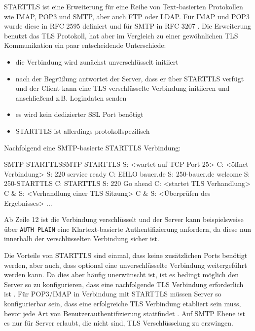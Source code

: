 STARTTLS ist eine Erweiterung für eine Reihe von Text-basierten Protokollen wie IMAP, POP3 und SMTP, aber auch FTP oder LDAP. Für IMAP und POP3 wurde diese in RFC 2595  definiert und für SMTP in RFC 3207 . Die Erweiterung benutzt das TLS Protokoll, hat aber im Vergleich zu einer gewöhnlichen TLS Kommunikation ein paar entscheidende Unterschiede:
\begin{itemize}
\item die Verbindung wird zunächst unverschlüsselt initiiert
\item nach der Begrüßung antwortet der Server, dass er über STARTTLS verfügt und der Client kann eine TLS verschlüsselte Verbindung initiieren und anschließend z.B. Logindaten senden
\item es wird kein dedizierter SSL Port benötigt
\item STARTTLS ist allerdings protokollspezifisch
\end{itemize}

Nachfolgend eine SMTP-basierte STARTTLS Verbindung:
\begin{mail}{SMTP-STARTTLS}{SMTP-STARTTLS}
S: <wartet auf TCP Port 25>
C: <öffnet Verbindung>
S: 220 service ready
C: EHLO bauer.de
S: 250-bauer.de welcome
S: 250-STARTTLS
C: STARTTLS
S: 220 Go ahead
C: <startet TLS Verhandlung>
C & S: <Verhandlung einer TLS Sitzung>
C & S: <Überprüfen des Ergebnisses>
...
\end{mail}

Ab Zeile 12 ist die Verbindung verschlüsselt und der Server kann beispielsweise über \verb#AUTH PLAIN# eine Klartext-basierte Authentifizierung anfordern, da diese nun innerhalb der verschlüsselten Verbindung sicher ist.

Die Vorteile von STARTTLS sind einmal, dass keine zusätzlichen Ports benötigt werden, aber auch, dass optional eine unverschlüsselte Verbindung weitergeführt werden kann. Da dies aber häufig unerwünscht ist, ist es bedingt möglich den Server so zu konfigurieren, dass eine nachfolgende TLS Verbindung erforderlich ist  . Für POP3/IMAP in Verbindung mit STARTTLS müssen Server so konfigurierbar sein, dass eine erfolgreiche TLS Verbindung etabliert sein muss, bevor jede Art von Benutzerauthentifizierung stattfindet . Auf SMTP Ebene ist es nur für Server erlaubt, die nicht  sind, TLS Verschlüsselung zu erzwingen.


